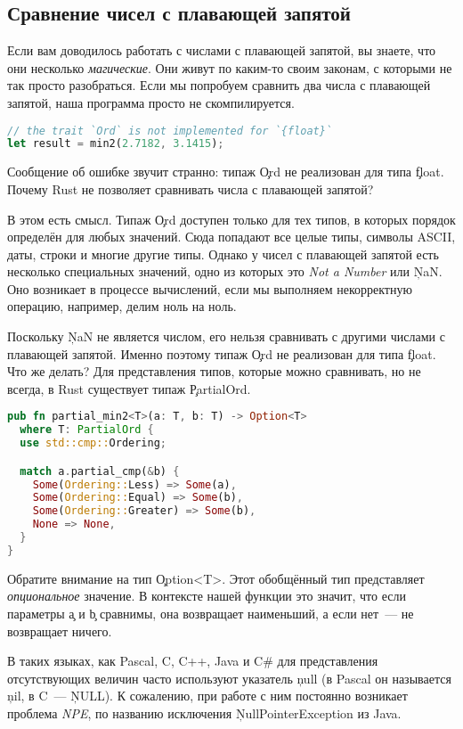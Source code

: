 \subsection{Сравнение чисел с плавающей запятой}

Если вам доводилось работать с числами с плавающей запятой, вы знаете, что они несколько {\em магические}.
Они живут по каким-то своим законам, с которыми не так просто разобраться.
Если мы попробуем сравнить два числа с плавающей запятой, наша программа просто не скомпилируется.

\begin{lstlisting}[language=Rust]
// the trait `Ord` is not implemented for `{float}`
let result = min2(2.7182, 3.1415);
\end{lstlisting}

Сообщение об ошибке звучит странно: типаж \c{Ord} не реализован для типа \c{float}.
Почему Rust не позволяет сравнивать числа с плавающей запятой?

В этом есть смысл. Типаж \c{Ord} доступен только для тех типов, в которых порядок определён для любых значений.
Сюда попадают все целые типы, символы ASCII, даты, строки и многие другие типы.
Однако у чисел с плавающей запятой есть несколько специальных значений, одно из которых это {\em Not a Number} или \c{NaN}.
Оно возникает в процессе вычислений, если мы выполняем некорректную операцию, например, делим ноль на ноль.

Поскольку \c{NaN} не является числом, его нельзя сравнивать с другими числами с плавающей запятой.
Именно поэтому типаж \c{Ord} не реализован для типа \c{float}.
Что же делать?
Для представления типов, которые можно сравнивать, но не всегда, в Rust существует типаж \c{PartialOrd}.

\begin{lstlisting}[language=Rust]
pub fn partial_min2<T>(a: T, b: T) -> Option<T>
  where T: PartialOrd {
  use std::cmp::Ordering;

  match a.partial_cmp(&b) {
    Some(Ordering::Less) => Some(a),
    Some(Ordering::Equal) => Some(b),
    Some(Ordering::Greater) => Some(b),
    None => None,
  }
}
\end{lstlisting}

Обратите внимание на тип \c{Option<T>}.
Этот обобщённый тип представляет {\em опциональное} значение.
В контексте нашей функции это значит, что если параметры \c{a} и \c{b} сравнимы, она возвращает наименьший, а если нет~--- не возвращает ничего.

В таких языках, как Pascal, C, C++, Java и C\# для представления отсутствующих величин часто используют указатель \c{null} (в Pascal он называется \c{nil}, в C~--- \c{NULL}).
К сожалению, при работе с ним постоянно возникает проблема {\em  NPE}, по названию исключения \c{NullPointerException} из Java.

